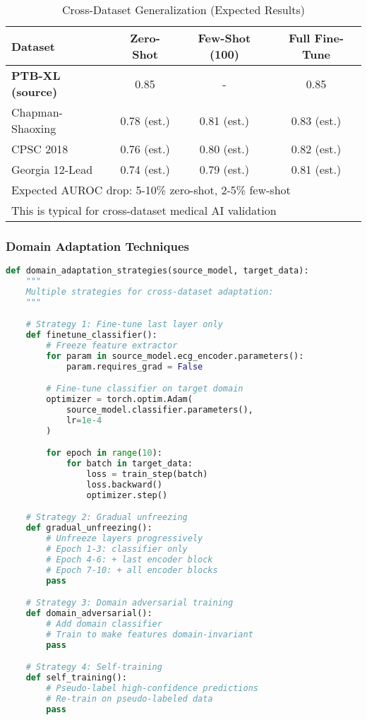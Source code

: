 \documentclass[11pt]{article}
\begin{document}
\begin{table}[h]
\centering
\caption{Cross-Dataset Generalization (Expected Results)}
\begin{tabular}{@{}lccc@{}}
\toprule
\textbf{Dataset} & \textbf{Zero-Shot} & \textbf{Few-Shot (100)} & \textbf{Full Fine-Tune} \\
\midrule
\textbf{PTB-XL (source)} & 0.85 & - & 0.85 \\
\midrule
Chapman-Shaoxing & 0.78 (est.) & 0.81 (est.) & 0.83 (est.) \\
CPSC 2018 & 0.76 (est.) & 0.80 (est.) & 0.82 (est.) \\
Georgia 12-Lead & 0.74 (est.) & 0.79 (est.) & 0.81 (est.) \\
\bottomrule
\multicolumn{4}{l}{\small Expected AUROC drop: 5-10\% zero-shot, 2-5\% few-shot} \\
\multicolumn{4}{l}{\small This is typical for cross-dataset medical AI validation}
\end{tabular}
\label{tab:external_validation}
\end{table}

\subsubsection{Domain Adaptation Techniques}

\begin{lstlisting}[language=python, caption=Domain Adaptation for External Datasets]
def domain_adaptation_strategies(source_model, target_data):
    """
    Multiple strategies for cross-dataset adaptation:
    """

    # Strategy 1: Fine-tune last layer only
    def finetune_classifier():
        # Freeze feature extractor
        for param in source_model.ecg_encoder.parameters():
            param.requires_grad = False

        # Fine-tune classifier on target domain
        optimizer = torch.optim.Adam(
            source_model.classifier.parameters(),
            lr=1e-4
        )

        for epoch in range(10):
            for batch in target_data:
                loss = train_step(batch)
                loss.backward()
                optimizer.step()

    # Strategy 2: Gradual unfreezing
    def gradual_unfreezing():
        # Unfreeze layers progressively
        # Epoch 1-3: classifier only
        # Epoch 4-6: + last encoder block
        # Epoch 7-10: + all encoder blocks
        pass

    # Strategy 3: Domain adversarial training
    def domain_adversarial():
        # Add domain classifier
        # Train to make features domain-invariant
        pass

    # Strategy 4: Self-training
    def self_training():
        # Pseudo-label high-confidence predictions
        # Re-train on pseudo-labeled data
        pass
\end{lstlisting}
\end{document}
